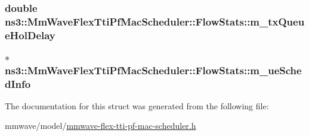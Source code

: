 \subsubsection[{\texorpdfstring{m\+\_\+tx\+Queue\+Hol\+Delay}{m_txQueueHolDelay}}]{\setlength{\rightskip}{0pt plus 5cm}double ns3\+::\+Mm\+Wave\+Flex\+Tti\+Pf\+Mac\+Scheduler\+::\+Flow\+Stats\+::m\+\_\+tx\+Queue\+Hol\+Delay}\hypertarget{structns3_1_1MmWaveFlexTtiPfMacScheduler_1_1FlowStats_a72ede109e7c1e0bc1919845f9b6bc758}{}\label{structns3_1_1MmWaveFlexTtiPfMacScheduler_1_1FlowStats_a72ede109e7c1e0bc1919845f9b6bc758}
\subsubsection[{\texorpdfstring{m\+\_\+ue\+Sched\+Info}{m_ueSchedInfo}}]{$\ast$ ns3\+::\+Mm\+Wave\+Flex\+Tti\+Pf\+Mac\+Scheduler\+::\+Flow\+Stats\+::m\+\_\+ue\+Sched\+Info}\hypertarget{structns3_1_1MmWaveFlexTtiPfMacScheduler_1_1FlowStats_a72d7b3722a08c0d4f4b553ce6ddd3955}{}\label{structns3_1_1MmWaveFlexTtiPfMacScheduler_1_1FlowStats_a72d7b3722a08c0d4f4b553ce6ddd3955}


The documentation for this struct was generated from the following file\+:\begin{DoxyCompactItemize}
\item 
mmwave/model/\hyperlink{mmwave-flex-tti-pf-mac-scheduler_8h}{mmwave-\/flex-\/tti-\/pf-\/mac-\/scheduler.\+h}\end{DoxyCompactItemize}
